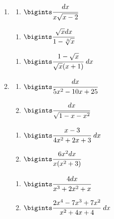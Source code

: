 \documentclass{article}
\begin{document}
\begin{multicols}{2}
\begin{enumerate}[label=\Roman*.]
	\item
	\begin{multicols}{3}
		\begin{enumerate}[label=\arabic*.]
			\setlength\itemsep{1em}
			\item $\bigints\cfrac{dx}{x\sqrt{x - 2}}$
		\end{enumerate}
		\vfill\null\columnbreak
		\begin{enumerate}[label=\arabic*., start=2]
			\setlength\itemsep{1em}
			\item $\bigints\cfrac{\sqrt{x}dx}{1 - \sqrt[3]{x}}$
		\end{enumerate}
		\vfill\null\columnbreak
		\begin{enumerate}[label=\arabic*., start=3]
			\setlength\itemsep{1em}
			\item $\bigints\cfrac{1 - \sqrt{x}}{\sqrt{x} (x + 1)}\ dx$
		\end{enumerate}
		\vfill\null\columnbreak
	\end{multicols}

	\item
	\begin{multicols}{3}
		\begin{enumerate}[label=\arabic*.]
			\setlength\itemsep{1em}
			\item $\bigints\cfrac{dx}{5x^2 - 10x + 25}$
			\item $\bigints\cfrac{dx}{\sqrt{1 - x - x^2}}$
		\end{enumerate}
		\vfill\null\columnbreak
		\begin{enumerate}[label=\arabic*., start=3]
			\setlength\itemsep{1em}
			\item $\bigints\cfrac{x-3}{4x^2+2x+3}\ dx$
			\item $\bigints\cfrac{6x^2dx}{x(x^2+3)}$
		\end{enumerate}
		\vfill\null\columnbreak
		\begin{enumerate}[label=\arabic*., start=5]
			\setlength\itemsep{1em}
			\item $\bigints\cfrac{4dx}{x^3 + 2x^2 + x}$
			\item $\bigints\cfrac{2x^4-7x^3+7x^2}{x^2 + 4x + 4}\ dx$
		\end{enumerate}
		\vfill\null\columnbreak
	\end{multicols}


\end{enumerate}
\end{multicols}
\end{document}

